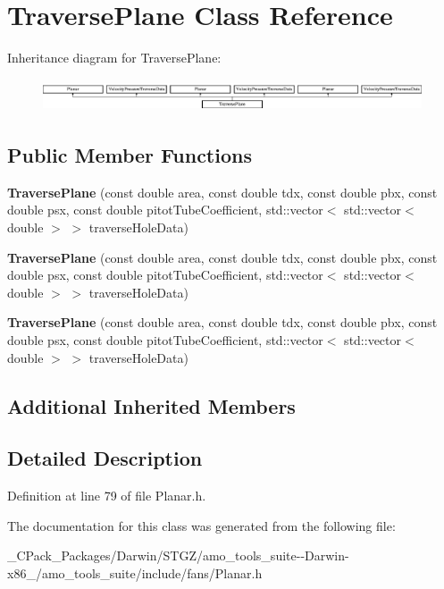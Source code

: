 \hypertarget{class_traverse_plane}{}\section{Traverse\+Plane Class Reference}
\label{class_traverse_plane}
Inheritance diagram for Traverse\+Plane\+:\begin{figure}[H]
\begin{center}
\leavevmode
\includegraphics[height=0.962199cm]{dc/d2a/class_traverse_plane}
\end{center}
\end{figure}
\subsection*{Public Member Functions}
\begin{DoxyCompactItemize}
\item 
\mbox{\label{class_traverse_plane_abbe5d384cc7fbd35c19c4f840247769f}} 
{\bfseries Traverse\+Plane} (const double area, const double tdx, const double pbx, const double psx, const double pitot\+Tube\+Coefficient, std\+::vector$<$ std\+::vector$<$ double $>$ $>$ traverse\+Hole\+Data)
\item 
\mbox{\label{class_traverse_plane_abbe5d384cc7fbd35c19c4f840247769f}} 
{\bfseries Traverse\+Plane} (const double area, const double tdx, const double pbx, const double psx, const double pitot\+Tube\+Coefficient, std\+::vector$<$ std\+::vector$<$ double $>$ $>$ traverse\+Hole\+Data)
\item 
\mbox{\label{class_traverse_plane_abbe5d384cc7fbd35c19c4f840247769f}} 
{\bfseries Traverse\+Plane} (const double area, const double tdx, const double pbx, const double psx, const double pitot\+Tube\+Coefficient, std\+::vector$<$ std\+::vector$<$ double $>$ $>$ traverse\+Hole\+Data)
\end{DoxyCompactItemize}
\subsection*{Additional Inherited Members}


\subsection{Detailed Description}


Definition at line 79 of file Planar.\+h.



The documentation for this class was generated from the following file\+:\begin{DoxyCompactItemize}
\item 
\+\_\+\+C\+Pack\+\_\+\+Packages/\+Darwin/\+S\+T\+G\+Z/amo\+\_\+tools\+\_\+suite-\/-\/\+Darwin-\/x86\+\_/amo\+\_\+tools\+\_\+suite/include/fans/Planar.\+h\end{DoxyCompactItemize}
